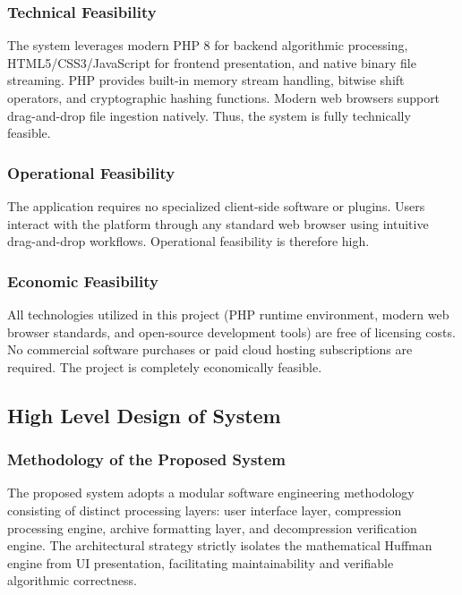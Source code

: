 \documentclass[12pt,a4paper]{article}
\begin{document}
\subsubsection{Technical Feasibility}
The system leverages modern PHP 8 for backend algorithmic processing, HTML5/CSS3/JavaScript for frontend presentation, and native binary file streaming. PHP provides built-in memory stream handling, bitwise shift operators, and cryptographic hashing functions. Modern web browsers support drag-and-drop file ingestion natively. Thus, the system is fully technically feasible.

\subsubsection{Operational Feasibility}
The application requires no specialized client-side software or plugins. Users interact with the platform through any standard web browser using intuitive drag-and-drop workflows. Operational feasibility is therefore high.

\subsubsection{Economic Feasibility}
All technologies utilized in this project (PHP runtime environment, modern web browser standards, and open-source development tools) are free of licensing costs. No commercial software purchases or paid cloud hosting subscriptions are required. The project is completely economically feasible.

\subsection{High Level Design of System}

\subsubsection{Methodology of the Proposed System}
The proposed system adopts a modular software engineering methodology consisting of distinct processing layers: user interface layer, compression processing engine, archive formatting layer, and decompression verification engine. The architectural strategy strictly isolates the mathematical Huffman engine from UI presentation, facilitating maintainability and verifiable algorithmic correctness.
\end{document}
